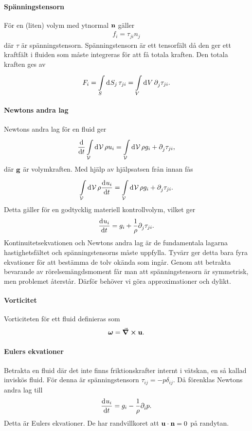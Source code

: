 \paragraph{Spänningstensorn}
För en (liten) volym med ytnormal $\vb{n}$ gäller
\begin{align*}
	f_{i} = \tau_{ji}n_{j}
\end{align*}
där $\tau$ är spänningstensorn. Spänningstensorn är ett tensorfält då den ger ett kraftfält i fluiden som måste integreras för att få totala kraften. Den totala kraften ges av
\begin{align*}
	F_{i} = \int\limits_{S}^{}\dd[]{S_{j}}\tau_{ji} = \int\limits_{V}^{}\dd[]{V}\partial_{j}^{}\tau_{ji}.
\end{align*}

\paragraph{Newtons andra lag}
Newtons andra lag för en fluid ger
\begin{align*}
	\dv{t}\int\limits_{\mathcal{V}}^{}\dd[]{\mathcal{V}}\rho u_{i} = \int\limits_{\mathcal{V}}^{}\dd[]{\mathcal{V}}\rho g_{i} + \partial_{j}^{}\tau_{ji},
\end{align*}
där $\vb{g}$ är volymkraften. Med hjälp av hjälpsatsen från innan fås
\begin{align*}
	\int\limits_{\mathcal{V}}^{}\dd[]{\mathcal{V}}\rho\dv[]{u_{i}}{t} = \int\limits_{\mathcal{V}}^{}\dd[]{\mathcal{V}}\rho g_{i} + \partial_{j}^{}\tau_{ji}.
\end{align*}
Detta gäller för en godtycklig materiell kontrollvolym, vilket ger
\begin{align*}
	\dv[]{u_{i}}{t} = g_{i} + \frac{1}{\rho}\partial_{j}^{}\tau_{ji}.
\end{align*}
Kontinuitetsekvationen och Newtons andra lag är de fundamentala lagarna hastighetsfältet och spänningstensorns måste uppfylla. Tyvärr ger detta bara fyra ekvationer för att bestämma de tolv okända som ingår. Genom att betrakta bevarande av rörelsemängdsmoment får man att spänningstensorn är symmetrisk, men problemet återstår. Därför behöver vi göra approximationer och dylikt.

\paragraph{Vorticitet}
Vorticiteten för ett fluid definieras som
\begin{align*}
	\vb*{\omega} = \curl{\vb{u}}.
\end{align*}

\paragraph{Eulers ekvationer}
Betrakta en fluid där det inte finns friktionskrafter internt i vätskan, en så kallad inviskös fluid. För denna är spänningstensorn $\tau_{ij} = -p\delta_{ij}$. Då förenklas Newtons andra lag till
\begin{align*}
	\dv[]{u_{i}}{t} = g_{i} - \frac{1}{\rho}\partial_{i}^{}p.
\end{align*}
Detta är Eulers ekvationer. De har randvillkoret att $\vb{u}\cdot\vb{n} = 0$ på randytan.

